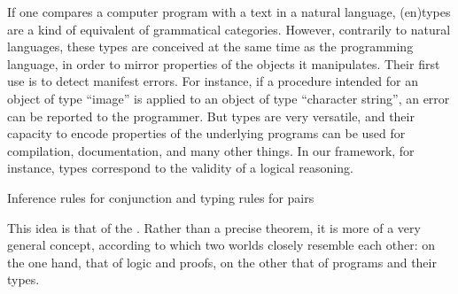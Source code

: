 If one compares a computer program with a text in a natural language,
\intro(en){types}
are a kind of equivalent of grammatical categories. However, contrarily to natural
languages, these types are conceived at the same time as the programming language, in order
to mirror properties of the objects it manipulates.
Their first use is to detect manifest errors. For instance, if a procedure
intended for an object of type “image” is applied to an object of type “character string”,
an error can be reported to the programmer.%
%
But types are very versatile, and their capacity to encode properties of the underlying
programs can be used for compilation, documentation, and many other things. In our
framework, for instance, types correspond to the validity of a logical reasoning.

\begin{marginfigure}




  
  \caption{Inference rules for conjunction and typing rules for pairs}
  \label{fig:curry-howard-example-en}
\end{marginfigure}

This idea is that of the .%
%
%
Rather than a precise theorem,
it is more of a very general concept, according to which two worlds closely resemble each
other: on the one hand, that of logic and proofs, on the other that of programs
and their types.

